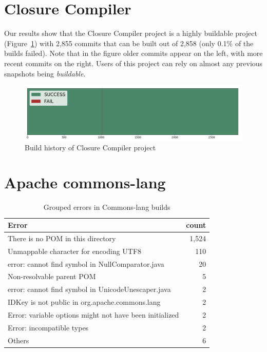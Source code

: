 \section{Closure Compiler}

Our results show that the Closure Compiler project is a highly buildable project (Figure~\ref{fig:closureHist}) with 2,855 commits that can be built out of 2,858 (only 0.1\% of the builds failed).
Note that in the figure older commits appear on the left, with more recent commits on the right.
Users of this project can rely on almost any previous snapshots being \emph{buildable}.

\begin{figure}[h]
	\begin{center}
		\includegraphics[width=\linewidth]{img/charts/ClosureHist}
		\caption{Build history of Closure Compiler project}
		\label{fig:closureHist}
	\end{center}
\end{figure}

\section{Apache commons-lang}

\begin{table}[h]
	\caption{Grouped errors in Commons-lang builds}
	\label{table:langErrors}
	\begin{center}
	\begin{tabular}{lr}
		\toprule
		\bf{Error} & \bf{count} \\ 
		\midrule
		There is no POM in this directory & 1,524 \\
		Unmappable character for encoding UTF8	& 110 \\
		error: cannot find symbol in NullComparator.java & 20 \\
		Non-resolvable parent POM & 5 \\
		error: cannot find symbol in UnicodeUnescaper.java & 2 \\
		IDKey is not public in org.apache.commons.lang & 2 \\
		Error: variable options might not have been initialized & 2 \\
		Error: incompatible types & 2 \\
		Others & 6 \\
		\bottomrule
	\end{tabular}
	\end{center}
\end{table}

